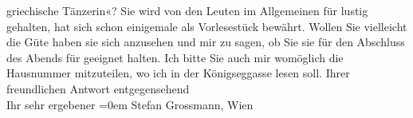 \begin{ledgroupsized}[t]{13cm}
                        griechische Tänzerin«? Sie wird von den Leuten im Allgemeinen für
                    lustig gehalten, hat sich schon einigemale als Vorlesestück bewährt. Wollen Sie
                    vielleicht die Güte haben sie sich anzusehen und mir zu sagen, ob Sie sie für
                    den Abschluss des Abends für geeignet halten.\pend
           \pstart
           Ich bitte Sie auch mir womöglich die Hausnummer mitzuteilen, wo ich in der Königseggasse lesen soll.\pend
           \pstart
           Ihrer freundlichen Antwort entgegensehend{\\[\baselineskip]}Ihr sehr ergebener\pend
           \leftskip=0em{}{\bigskip}\pstart
           \noindent{}\label{T_L01718_1v}\label{T_L01718_1h}
                        Stefan Grossmann, Wien\pend
                     \endnumbering{}\end{ledgroupsized}  \newcommand{\dateiname}{L01718}\newcommand{\titel}{Arthur Schnitzler an Stefan Großmann, 9. 10. 1907}\newcommand{\editorInnen}{Martin Anton Müller und Gerd-Hermann Susen}
            \footnotesize
\begin{ledgroupsized}[t]{11.5cm}
\end{ledgroupsized}
         
      